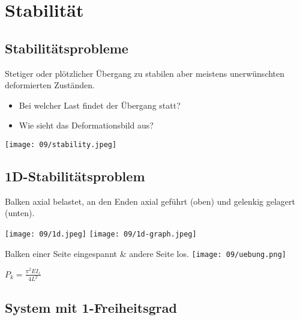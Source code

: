 \section{Stabilität}
    \subsection{Stabilitätsprobleme}
        Stetiger oder plötzlicher Übergang zu stabilen aber meistens unerwünschten deformierten Zuständen.\vspace{-1mm}
        \begin{itemize}
            \item Bei welcher Last findet der Übergang statt?
            \item Wie sieht das Deformationsbild aus?
        \end{itemize}
        \begin{center}
            \texttt{[image: 09/stability.jpeg]}
        \end{center}
    \subsection{1D-Stabilitätsproblem}
        Balken axial belastet, an den Enden axial geführt (oben) und gelenkig gelagert (unten).
        \begin{center}
            \texttt{[image: 09/1d.jpeg]}
            \texttt{[image: 09/1d-graph.jpeg]}
        \end{center}
        Balken einer Seite eingespannt \& andere Seite los.
        \texttt{[image: 09/uebung.png]}
        \vspace{-17mm}
        \begin{flushright}
        $\displaystyle P_k=\frac{\pi^2EI_z}{4L^2}\qquad\qquad$
        \end{flushright}
        \vspace{7mm}
        
        \begin{comment}
        \subsubsection{Plastifizieren vor Knicken}
            $P_{plast} \leqslant P_k $
        \end{comment}
    \subsection{System mit 1-Freiheitsgrad}
        \TODO{}
